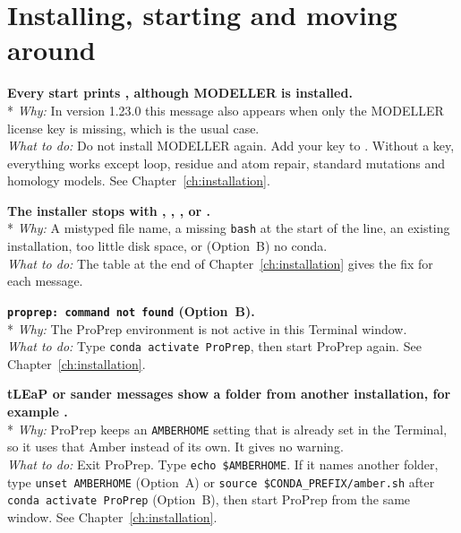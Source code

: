 \section{Installing, starting and moving around}\label{sec:troubleshooting-start}

{\bfseries Every start prints , although MODELLER is installed.}\\*
\emph{Why:} In version 1.23.0 this message also appears when only the MODELLER
license key is missing, which is the usual case.\\
\emph{What to do:} Do not install MODELLER again. Add your key to
. Without a key, everything works except loop,
residue and atom repair, standard mutations and homology models. See
Chapter~\ref{ch:installation}.

{\bfseries The installer stops with ,
, ,
 or .}\\*
\emph{Why:} A mistyped file name, a missing \texttt{bash} at the start of the
line, an existing installation, too little disk space, or (Option~B) no
conda.\\
\emph{What to do:} The table at the end of Chapter~\ref{ch:installation}
gives the fix for each message.

{\bfseries \texttt{proprep: command not found} (Option~B).}\\*
\emph{Why:} The ProPrep environment is not active in this Terminal window.\\
\emph{What to do:} Type \texttt{conda activate ProPrep}, then start ProPrep
again. See Chapter~\ref{ch:installation}.

{\bfseries tLEaP or sander messages show a folder from another installation,
for example .}\\*
\emph{Why:} ProPrep keeps an \texttt{AMBERHOME} setting that is already set in
the Terminal, so it uses that Amber instead of its own. It gives no warning.\\
\emph{What to do:} Exit ProPrep. Type \texttt{echo \$AMBERHOME}. If it names
another folder, type \texttt{unset AMBERHOME} (Option~A) or
\texttt{source \$CONDA\_PREFIX/amber.sh} after \texttt{conda activate ProPrep}
(Option~B), then start ProPrep from the same window. See
Chapter~\ref{ch:installation}.

